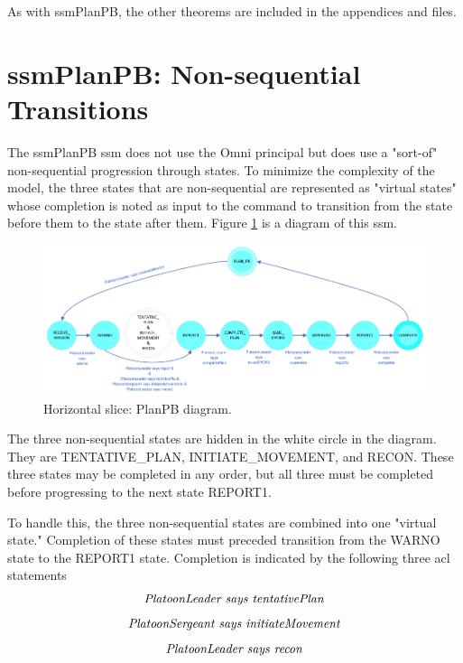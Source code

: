 \documentclass[../../main/main.tex]{subfiles}
\begin{document}
\HOLssmConductORPTheoremsPlatoonLeaderXXACTIONSXXINXXtrapXXlemma
\HOLssmConductORPTheoremsPlatoonLeaderXXACTIONSXXINXXtrapXXjustifiedXXlemma
\HOLssmConductORPTheoremsPlatoonLeaderXXACTIONSXXINXXtrapXXjustifiedXXthm


As with ssmPlanPB, the other theorems are included in the appendices and files.
\section{ssmPlanPB: Non-sequential Transitions}
The ssmPlanPB \gls{ssm} does not use the Omni principal but does use a "sort-of" non-sequential progression through states.  To minimize the complexity of the model, the three states that are non-sequential are represented as "virtual states" whose completion is noted as input to the command to transition from the state before them to the state after them.  Figure \ref{ssmPlanPBDiagram2a} is a diagram of this \gls{ssm}.

\begin{figure}[h!]
\centering
\includegraphics[width=\textwidth]{../figures/ssmPlanPBDiagram}
\caption{\label{ssmPlanPBDiagram2a} Horizontal slice: PlanPB diagram.}
\end{figure}

The three non-sequential states are hidden in the white circle in the diagram.  They are TENTATIVE_PLAN, INITIATE_MOVEMENT, and RECON. These three states may be completed in any order, but all three must be completed before progressing to the next state REPORT1.  

To handle this, the three non-sequential states are combined into one "virtual state."  Completion of these states must preceded transition from the WARNO state to the REPORT1 state.  Completion is indicated by the following three \gls{acl} statements 
\[\text{\textit{PlatoonLeader says tentativePlan}}\]
\[\text{\textit{PlatoonSergeant says initiateMovement}}\]
\[\text{\textit{PlatoonLeader says recon}}\]
\end{document}
